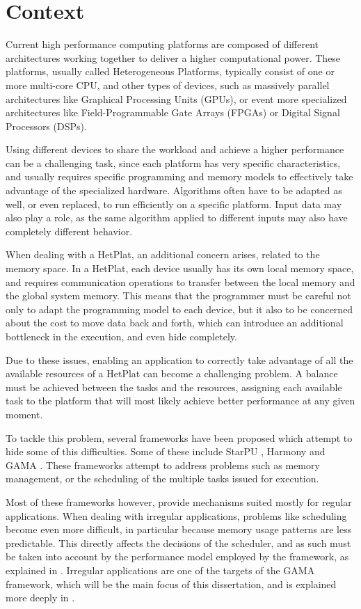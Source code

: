 \section{Context}

Current high performance computing platforms are composed of different architectures working together to deliver a higher computational power. These platforms, usually called Heterogeneous Platforms, typically consist of one or more multi-core CPU, and other types of devices, such as massively parallel architectures like Graphical Processing Units (GPUs), or event more specialized architectures like Field-Programmable Gate Arrays (FPGAs) or Digital Signal Processors (DSPs).

Using different devices to share the workload and achieve a higher performance can be a challenging task, since each platform has very specific characteristics, and usually requires specific programming and memory models to effectively take advantage of the specialized hardware. Algorithms often have to be adapted as well, or even replaced, to run efficiently on a specific platform. Input data may also play a role, as the same algorithm applied to different inputs may also have completely different behavior.

When dealing with a HetPlat, an additional concern arises, related to the memory space. In a HetPlat, each device usually has its own local memory space, and requires communication operations to transfer between the local memory and the global system memory. This means that the programmer must be careful not only to adapt the programming model to each device, but it also to be concerned about the cost to move data back and forth, which can introduce an additional bottleneck in the execution, and even hide completely.

Due to these issues, enabling an application to correctly take advantage of all the available resources of a HetPlat can become a challenging problem. A balance must be achieved between the tasks and the resources, assigning each available task to the platform that will most likely achieve better performance at any given moment.

To tackle this problem, several frameworks have been proposed which  attempt to hide some of this difficulties. Some of these include StarPU \cite{augonnet2011starpu}, Harmony \cite{diamos2008harmony} and GAMA \cite{joao2012gama}. These frameworks attempt to address problems such as memory management, or the scheduling of the multiple tasks issued for execution.

Most of these frameworks however, provide mechanisms suited mostly for regular applications. When dealing with irregular applications, problems like scheduling become even more difficult, in particular because memory usage patterns are less predictable. This directly affects the decisions of the scheduler, and as such must be taken into account by the performance model employed by the framework, as explained in \cite{artur2012gama}. Irregular applications are one of the targets of the GAMA framework, which will be the main focus of this dissertation, and is explained more deeply in .




